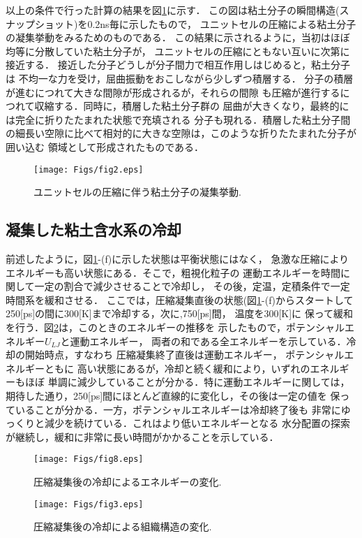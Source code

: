 以上の条件で行った計算の結果を図\ref{fig:fig2}に示す．
この図は粘土分子の瞬間構造(スナップショット)を0.2ns毎に示したもので，
ユニットセルの圧縮による粘土分子の凝集挙動をみるためのものである．
この結果に示されるように，当初はほぼ均等に分散していた粘土分子が，
ユニットセルの圧縮にともない互いに次第に接近する．
接近した分子どうしが分子間力で相互作用しはじめると，粘土分子は
不均一な力を受け，屈曲振動をおこしながら少しずつ積層する．
分子の積層が進むにつれて大きな間隙が形成されるが，それらの間隙
も圧縮が進行するにつれて収縮する．同時に，積層した粘土分子群の
屈曲が大きくなり，最終的には完全に折りたたまれた状態で充填される
分子も現れる．積層した粘土分子間の細長い空隙に比べて相対的に大きな空隙は，このような折りたたまれた分子が囲い込む
領域として形成されたものである．
\begin{figure}[h]
	\begin{center}
	\texttt{[image: Figs/fig2.eps]} 
	\end{center}
	\caption{
		ユニットセルの圧縮に伴う粘土分子の凝集挙動.
	} 
	\label{fig:fig2}
\end{figure}
\subsection{凝集した粘土含水系の冷却}
前述したように，図\ref{fig:fig2}-(f)に示した状態は平衡状態にはなく，
急激な圧縮によりエネルギーも高い状態にある．そこで，粗視化粒子の
運動エネルギーを時間に関して一定の割合で減少させることで冷却し，
その後，定温，定積条件で一定時間系を緩和させる．
ここでは，圧縮凝集直後の状態(図\ref{fig:fig2}-(f)からスタートして
250[ps]の間に300[K]まで冷却する，次に,750[ps]間， 温度を300[K]に
保って緩和を行う．図\ref{fig:fig8}は，このときのエネルギーの推移を
示したもので，ポテンシャルエネルギー$U_{LJ}$と運動エネルギー，
両者の和である全エネルギーを示している．冷却の開始時点，すなわち
圧縮凝集終了直後は運動エネルギー， ポテンシャルエネルギーともに
高い状態にあるが，冷却と続く緩和により，いずれのエネルギーもほぼ
単調に減少していることが分かる．特に運動エネルギーに関しては，
期待した通り，250[ps]間にほとんど直線的に変化し，その後は一定の値を
保っていることが分かる．一方，ポテンシャルエネルギーは冷却終了後も
非常にゆっくりと減少を続けている．これはより低いエネルギーとなる
水分配置の探索が継続し，緩和に非常に長い時間がかかることを示している．
\begin{figure}[h]
	\begin{center}
	\texttt{[image: Figs/fig8.eps]} 
	\end{center}
	\caption{
		圧縮凝集後の冷却によるエネルギーの変化.
	} 
	\label{fig:fig8}
\end{figure}
\begin{figure}[h]
	\begin{center}
	\texttt{[image: Figs/fig3.eps]} 
	\end{center}
	\caption{
		圧縮凝集後の冷却による組織構造の変化.
	} 
	\label{fig:fig3}
\end{figure}


